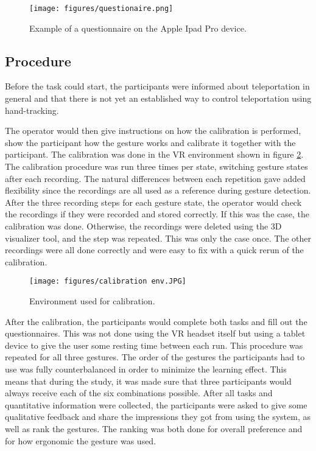 \begin{figure}[!ht]
    \centering
    \texttt{[image: figures/questionaire.png]}
    \caption{Example of a questionnaire on the Apple Ipad Pro device.}
    \label{fig:Ipad}
\end{figure}

\subsection{Procedure}
Before the task could start, the participants were informed about teleportation in general and that there is not yet an established way to control teleportation using hand-tracking.

The operator would then give instructions on how the calibration is performed, show the participant how the gesture works and calibrate it together with the participant. The calibration was done in the VR environment shown in figure \ref{fig:calibrationEnv}. The calibration procedure was run three times per state, switching gesture states after each recording. The natural differences between each repetition gave added flexibility since the recordings are all used as a reference during gesture detection. After the three recording steps for each gesture state, the operator would check the recordings if they were recorded and stored correctly. If this was the case, the calibration was done. Otherwise, the recordings were deleted using the 3D visualizer tool, and the step was repeated. This was only the case once. The other recordings were all done correctly and were easy to fix with a quick rerun of the calibration. 

\begin{figure}[!h]
    \centering
    \texttt{[image: figures/calibration env.JPG]}
    \caption{Environment used for calibration.}
    \label{fig:calibrationEnv}
\end{figure}

After the calibration, the participants would complete both tasks and fill out the questionnaires. This was not done using the VR headset itself but using a tablet device to give the user some resting time between each run. This procedure was repeated for all three gestures. 
The order of the gestures the participants had to use was fully counterbalanced in order to minimize the learning effect. This means that during the study, it was made sure that three participants would always receive each of the six combinations possible. 
After all tasks and quantitative information were collected, the participants were asked to give some qualitative feedback and share the impressions they got from using the system, as well as rank the gestures. The ranking was both done for overall preference and for how ergonomic the gesture was used.   

